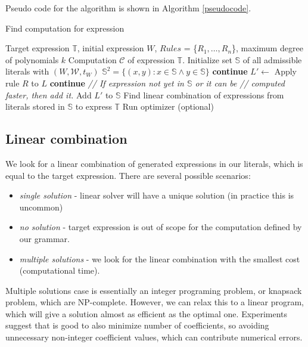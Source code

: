 Pseudo code for the algorithm is shown in Algorithm \ref{pseudocode}.

\begin{algorithm}[t]
\caption{Find computation for expression}
\begin{algorithmic} 
\REQUIRE Target expression $\mathbb{T}$, initial expression $W$, $Rules$ = \{$R_1, \dots, R_n$\}, maximum degree of polynomials $k$
\ENSURE Computation $\mathcal{C}$ of expression $\mathbb{T}$.
\STATE Initialize set $\mathbb{S}$ of all admissible literals with $(W, \mathcal{W}, t_W)$
\STATE $\mathbb{S}^2 = \{ (x, y) : x \in \mathbb{S} \land y \in \mathbb{S}\}$ 
\STATE \textbf{continue}
\ENDIF
\STATE $L' \gets$ Apply rule $R$ to $L$
  \STATE \textbf{continue}
\ENDIF
\STATE \emph{// If expression not yet in $\mathbb{S}$ or it can be}
\STATE \emph{// computed faster, then add it.}
  \STATE Add $L'$ to $\mathbb{S}$
\ENDIF
\ENDFOR
\ENDFOR
\ENDWHILE
\STATE Find linear combination of expressions from literals stored in $\mathbb{S}$ to express $\mathbb{T}$
\STATE Run optimizer (optional)
\end{algorithmic}
\label{pseudocode}
\end{algorithm}


\subsection{Linear combination}
\label{sec:linear}

We look for a linear combination of generated expressions in our
literals, which is equal to the target expression. There are several
possible scenarios:
\begin{itemize}
  \item \emph{single solution} - linear solver will have a unique solution (in practice
 this is uncommon)
 \item \emph{no solution} - target expression is out of scope for the computation defined by
our grammar. 
 \item  \emph{multiple solutions} - we look for the linear combination with the smallest cost
(computational time). 
\end{itemize}

Multiple solutions case is essentially an integer programing
problem, or knapsack problem, which are NP-complete. However, we can
relax this to a linear program, which will give a solution almost as
efficient as the optimal one. Experiments suggest that is good to
also minimize number of coefficients, so avoiding unnecessary
non-integer coefficient values, which can contribute numerical errors.


